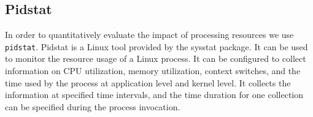 \subsection{Pidstat}
In order to quantitatively evaluate the impact of processing resources we use \texttt{pidstat}.
Pidstat is a Linux tool provided by the sysstat package.
It can be used to monitor the resource usage of a Linux process.
It can be configured to collect information on CPU utilization, memory utilization, context switches, and the time  used by the process at application level and kernel level.
It collects the information at specified time intervals, and the time duration for one collection can be specified during the process invocation.

